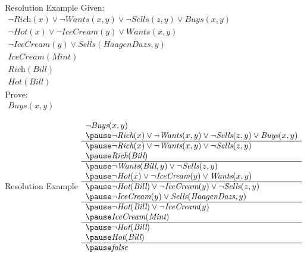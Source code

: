 \documentclass[14pt]{beamer}
\begin{document}
\begin{frame}{Resolution Example}
	Given:
	\\[.5em]
	$
	\begin{array}{l}
		\lnot\textit{Rich}(x) \lor \lnot\textit{Wants}(x, y) \lor \lnot\textit{Sells}(z, y) \lor \textit{Buys}(x, y) \\
		\lnot\textit{Hot}(x) \lor \lnot\textit{IceCream}(y) \lor \textit{Wants}(x, y) \\
		\lnot\textit{IceCream}(y) \lor \textit{Sells}(\textit{HaagenDazs}, y) \\
		\textit{IceCream}(\textit{Mint}) \\
		\textit{Rich}(\textit{Bill}) \\
		\textit{Hot}(\textit{Bill})
	\end{array}
	$
	\\[1em]
	Prove:
	\\[.5em]
	$
	\begin{array}{l}
		\textit{Buys}(x, y)
	\end{array}
	$
\end{frame}
\begin{frame}{Resolution Example}
	$
	\begin{array}{l}
		\lnot\textit{Buys}(x, y) \\
		\pause
		\lnot\textit{Rich}(x) \lor \lnot\textit{Wants}(x, y) \lor \lnot\textit{Sells}(z, y) \lor \textit{Buys}(x, y) \\
		\hline
		\pause
		\lnot\textit{Rich}(x) \lor \lnot\textit{Wants}(x, y) \lor \lnot\textit{Sells}(z, y)	\\
		\pause
		\textit{Rich}(\textit{Bill}) \\
		\hline
		\pause
		\lnot\textit{Wants}(\textit{Bill}, y) \lor \lnot\textit{Sells}(z, y) \\
		\pause
		\lnot\textit{Hot}(x) \lor \lnot\textit{IceCream}(y) \lor \textit{Wants}(x, y) \\
		\hline
		\pause
		\lnot\textit{Hot}(\textit{Bill}) \lor \lnot\textit{IceCream}(y) \lor \lnot\textit{Sells}(z, y) \\
		\pause
		\lnot\textit{IceCream}(y) \lor \textit{Sells}(\textit{HaagenDazs}, y) \\
		\hline
		\pause
		\lnot\textit{Hot}(\textit{Bill}) \lor \lnot\textit{IceCream}(y) \\
		\pause
		\textit{IceCream}(\textit{Mint}) \\
		\hline
		\pause
		\lnot\textit{Hot}(\textit{Bill}) \\
		\pause
		\textit{Hot}(\textit{Bill}) \\
		\hline
		\pause
		\textit{false}
	\end{array}
	$
\end{frame}
\end{document}
